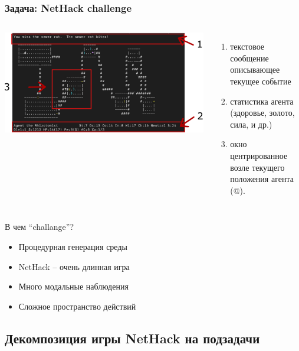 \begin{frame}
\frametitle{Задача: NetHack challenge}
\begin{columns}
  \centering
  \includegraphics[width=1\linewidth]{images/nethack_map_view.pdf}
\begin{enumerate}
    \item текстовое сообщение описывающее текущее событие
    \item статистика агента (здоровье, золото, сила, и др.) 
    \item окно центрированное возле текущего положения агента (@).
\end{enumerate}
\end{columns} 
\vspace{20pt}
В чем ``challange''?
\begin{itemize}
    \item Процедурная генерация среды
    \item NetHack – очень длинная игра
    \item Много модальные наблюдения
    \item Сложное пространство действий
\end{itemize}


\end{frame}

\subsection{Декомпозиция игры NetHack на подзадачи}

